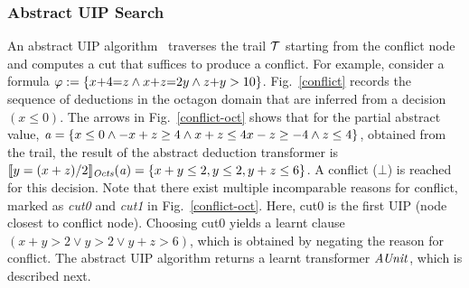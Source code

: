 \subsubsection{Abstract UIP Search}
An abstract UIP algorithm~\cite{DBLP:journals/fmsd/BrainDGHK14} 
traverses the trail $\mathcal{T}$ starting from the conflict node and 
computes a cut that suffices to produce a conflict.  
For example, consider a formula $\varphi:= \{x{+}4{=}z \wedge 
x{+}z{=}2y \wedge z{+}y>10\}$.   Fig.~\ref{conflict} records the 
sequence of deductions in the octagon domain that are inferred from 
a decision $(x{\leq}0)$.  The arrows in Fig.~\ref{conflict-oct} shows that 
for the partial abstract value, 
$\mathit{a}=\{x\leq0 \wedge -x+z\geq4 \wedge x+z\leq4 x-z\geq-4 \wedge z\leq4\}$, 
obtained from the trail, the result of the abstract deduction transformer is
$\llbracket y=(x+z)/2 \rrbracket_{\mathit{Octs}}(\mathit{a})=\{x+y\leq2, y\leq2, y+z\leq6\}$.
A conflict ($\bot$) is reached for this decision.   
Note that there exist multiple incomparable reasons for conflict,
marked as {\em cut0} and {\em cut1} in Fig.~\ref{conflict-oct}.  Here, cut0 is 
the first UIP (node closest to conflict node).  Choosing cut0 yields 
a learnt clause $(x+y > 2 \vee y > 2 \vee y+z>6)$, which is obtained by 
negating the reason for conflict.  The abstract UIP algorithm returns a learnt 
transformer $\mathit{AUnit}$, which is described next. 
%    
